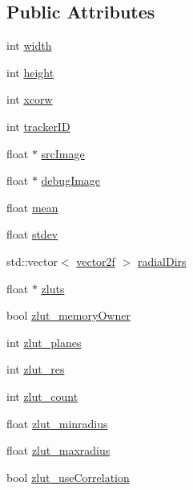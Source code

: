 \subsection*{Public Attributes}
\begin{DoxyCompactItemize}
\item 
int \hyperlink{class_c_p_u_tracker_afb77fe1c7e1a38d25d5aadded5a36fb9}{width}
\item 
int \hyperlink{class_c_p_u_tracker_a5d1e01c6a878ff7f0c138f011b0ca5d3}{height}
\item 
int \hyperlink{class_c_p_u_tracker_a31994d45332742dd422f876f5897233b}{xcorw}
\item 
int \hyperlink{class_c_p_u_tracker_ad80ba679c9c88be30b018a31fef72ed1}{tracker\+ID}
\item 
float $\ast$ \hyperlink{class_c_p_u_tracker_a393778bc9b49eb6d5014fd814c5dfcdf}{src\+Image}
\item 
float $\ast$ \hyperlink{class_c_p_u_tracker_a58cde24ef2ce5057d42b678951a2239b}{debug\+Image}
\item 
float \hyperlink{class_c_p_u_tracker_a611986d18c52010b79815a9cb920b00d}{mean}
\item 
float \hyperlink{class_c_p_u_tracker_ae5697cf2319755515193ae21d0c8995f}{stdev}
\item 
std\+::vector$<$ \hyperlink{std__incl_8h_aba974726076ec2d63a67114c536d123e}{vector2f} $>$ \hyperlink{class_c_p_u_tracker_a88ec0839b0866df86fb12603e553a9b9}{radial\+Dirs}
\item 
float $\ast$ \hyperlink{class_c_p_u_tracker_ac187d3124a66c6743c2037bb82d9a67d}{zluts}
\item 
bool \hyperlink{class_c_p_u_tracker_a52fb6848573fc603a4e6e435e3e2352f}{zlut\+\_\+memory\+Owner}
\item 
int \hyperlink{class_c_p_u_tracker_ad28d60ad587ae3f89b9dba7f82c135f7}{zlut\+\_\+planes}
\item 
int \hyperlink{class_c_p_u_tracker_a058eae282c9bf847cd8e39664688c5bc}{zlut\+\_\+res}
\item 
int \hyperlink{class_c_p_u_tracker_a492dd4655d741df0d4d1bb51c52bcca2}{zlut\+\_\+count}
\item 
float \hyperlink{class_c_p_u_tracker_a18ed4e4c7e10ea5728eaf4d36b864fdc}{zlut\+\_\+minradius}
\item 
float \hyperlink{class_c_p_u_tracker_aac96fa28c0ee4462e176e78c9ec91335}{zlut\+\_\+maxradius}
\item 
bool \hyperlink{class_c_p_u_tracker_a324e4b9cfe1337d9c33bf9690e6c1ef6}{zlut\+\_\+use\+Correlation}

\end{DoxyCompactItemize}
